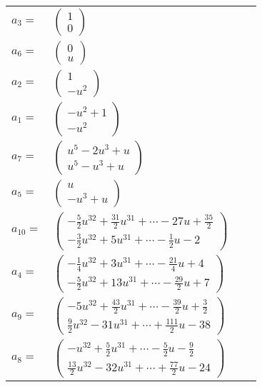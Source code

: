 \documentclass[1p]{elsarticle_modified}
\theoremstyle{definition}
\begin{document}
\begin{tabular}{m{7pt} m{180pt} m{7pt} m{180pt} }
\flushright $a_{3}=$&$\begin{pmatrix}1\\0\end{pmatrix}$ \\
\flushright $a_{6}=$&$\begin{pmatrix}0\\u\end{pmatrix}$ \\
\flushright $a_{2}=$&$\begin{pmatrix}1\\- u^2\end{pmatrix}$ \\
\flushright $a_{1}=$&$\begin{pmatrix}- u^2+1\\- u^2\end{pmatrix}$ \\
\flushright $a_{7}=$&$\begin{pmatrix}u^5-2 u^3+u\\u^5- u^3+u\end{pmatrix}$ \\
\flushright $a_{5}=$&$\begin{pmatrix}u\\- u^3+u\end{pmatrix}$ \\
\flushright $a_{10}=$&$\begin{pmatrix}-\frac{5}{2} u^{32}+\frac{31}{2} u^{31}+\cdots-27 u+\frac{35}{2}\\-\frac{3}{2} u^{32}+5 u^{31}+\cdots-\frac{1}{2} u-2\end{pmatrix}$ \\
\flushright $a_{4}=$&$\begin{pmatrix}-\frac{1}{4} u^{32}+3 u^{31}+\cdots-\frac{21}{4} u+4\\-\frac{5}{2} u^{32}+13 u^{31}+\cdots-\frac{29}{2} u+7\end{pmatrix}$ \\
\flushright $a_{9}=$&$\begin{pmatrix}-5 u^{32}+\frac{43}{2} u^{31}+\cdots-\frac{39}{2} u+\frac{3}{2}\\\frac{9}{2} u^{32}-31 u^{31}+\cdots+\frac{111}{2} u-38\end{pmatrix}$ \\
\flushright $a_{8}=$&$\begin{pmatrix}- u^{32}+\frac{5}{2} u^{31}+\cdots-\frac{5}{2} u-\frac{9}{2}\\\frac{13}{2} u^{32}-32 u^{31}+\cdots+\frac{77}{2} u-24\end{pmatrix}$ \\

\end{tabular}
\end{document}
